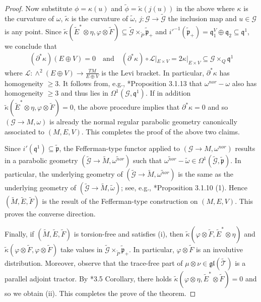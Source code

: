 \documentclass[11pt]{amsart}
\begin{document}
\begin{proof}
Now substitute $\phi=\kappa(u)$ and $\tilde\phi=\tilde\kappa(j(u))$ in the above where $\kappa$ is the curvature of $\omega$, $\tilde\kappa$ is the curvature of $\tilde\omega$, $j:\mathcal G\to\tilde{\mathcal G}$ the inclusion map and $u\in\mathcal G$ is any point. Since $\tilde\kappa(\tilde E^*\otimes\eta,\varphi\otimes\tilde F)\subseteq\tilde{\mathcal G}\times_{\tilde P}\tilde{\mathfrak{\mathfrak p}}_+$ and $i'^{-1}(\tilde{\mathfrak p}_+)=\mathfrak q_{1}^V\oplus\mathfrak q_2\subseteq\mathfrak q^1$, we conclude that
\begin{align*}
(\partial^*\kappa)(E\oplus V)=0
\quad\text{and}\quad
    (\partial^*\kappa)\circ\mathcal L|_{E\times V}=2\kappa|_{E\times V}\subseteq\mathcal G\times_Q\mathfrak q^1
\end{align*}
where $\mathcal L:\wedge^2(E\oplus V)\to\frac{TM}{E\oplus V}$ is the Levi bracket. In particular, $\partial^*\kappa$ has homogeneity $\geq 3$. It follows from, e.g., \cite{Book}*{Proposition 3.1.13} that $\omega^{nor}-\omega$ also has homogeneity $\geq 3$ and thus lies in $\Omega^1(\mathcal G,\mathfrak q^1)$. If in addition $\tilde\kappa(\tilde E^*\otimes\eta,\varphi\otimes\tilde F)=0$, the above procedure implies that $\partial^*\kappa=0$ and so $(\mathcal G\to M,\omega)$ is already the normal regular parabolic geometry canonically associated to $(M,E,V)$. This completes the proof of the above two claims.

Since $i'(\mathfrak q^1)\subseteq\tilde{\mathfrak p}$, the Fefferman-type functor applied to $(\mathcal G\to M,\omega^{nor})$ results in a parabolic geometry $(\tilde{\mathcal G}\to\tilde M,\widetilde{\omega^{nor}})$ such that $\widetilde{\omega^{nor}}-\tilde\omega\in\Omega^1(\tilde{\mathcal G},\tilde{\mathfrak p})$. In particular, the underlying geometry of $(\tilde{\mathcal G}\to\tilde M,\widetilde{\omega^{nor}})$ is the same as the underlying geometry of $(\tilde{\mathcal G}\to\tilde M,\tilde\omega)$; see, e.g., \cite{Book}*{Proposition 3.1.10 (1)}. Hence $(\tilde M,\tilde E,\tilde F)$ is the result of the Fefferman-type construction on $(M,E,V)$. This proves the converse direction.

Finally, if $(\tilde M,\tilde E,\tilde F)$ is torsion-free and satisfies (i), then $\tilde\kappa(\varphi\otimes\tilde F,\tilde E^*\otimes\eta)$ and $\tilde\kappa(\varphi\otimes\tilde F,\varphi\otimes\tilde F)$ take values in $\tilde{\mathcal G}\times_{\tilde P}\tilde{\mathfrak p}_+$. In particular, $\varphi\otimes\tilde F$ is an involutive distribution. Moreover, observe that the trace-free part of $\mu\otimes\nu\in\mathfrak{gl}(\tilde{\mathcal T})$ is a parallel adjoint tractor. By \cite{Cap08}*{3.5 Corollary}, there holds $\tilde\kappa(\varphi\otimes\eta,\tilde E^*\otimes\tilde F)=0$ and so we obtain (ii). This completes the prove of the theorem.
\end{proof}
\end{document}
